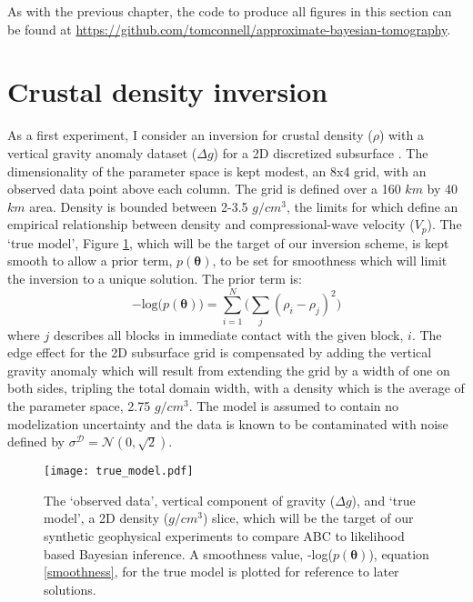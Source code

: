 As with the previous chapter, the code to produce all figures in this section can be found at \url{https://github.com/tomconnell/approximate-bayesian-tomography}.\par


\section{Crustal density inversion}

As a first experiment, I consider an inversion for crustal density ($\rho$) with a vertical gravity anomaly dataset ($\Delta g$) for a 2D discretized subsurface \citep[p.184-195,378]{blakely1996}. The dimensionality of the parameter space is kept modest, an 8x4 grid, with an observed data point above each column. The grid is defined over a 160 $km$ by 40 $km$ area. Density is bounded between 2-3.5 $g/cm^3$, the limits for which \citet{Brocher2005} define an empirical relationship between density and compressional-wave velocity ($V_p$). The `true model', Figure \ref{true_model}, which will be the target of our inversion scheme, is kept smooth to allow a prior term, $p(\bm{\theta})$, to be set for smoothness which will limit the inversion to a unique solution. The prior term is:
\begin{equation}
-\text{log}\big(p(\bm{\theta})\big) = \sum_{i = 1}^{N} \Big(\sum_{j} (\rho_i - \rho_j)^2\Big)
\label{smoothness}
\end{equation}
where $j$ describes all blocks in immediate contact with the given block, $i$. The edge effect for the 2D subsurface grid is compensated by adding the vertical gravity anomaly which will result from extending the grid by a width of one on both sides, tripling the total domain width, with a density which is the average of the parameter space, 2.75 $g/cm^3$. The model is assumed to contain no modelization uncertainty and the data is known to be contaminated with noise defined by $\sigma^{\mathcal{D}} = \mathcal{N}(0,\sqrt{2})$.
\begin{figure}[H]
	\centering
	\texttt{[image: true\_model.pdf]}
	\caption{The `observed data', vertical component of gravity ($\Delta g$), and `true model', a 2D density ($g/cm^3$) slice, which will be the target of our synthetic geophysical experiments to compare ABC to likelihood based Bayesian inference. A smoothness value, -log($p(\bm{\theta})$), equation \ref{smoothness}, for the true model is plotted for reference to later solutions.}
	\label{true_model}
\end{figure}
